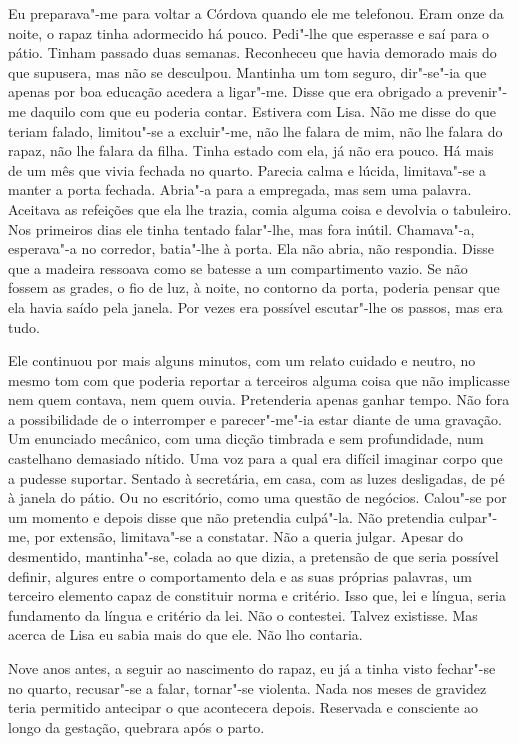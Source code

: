 Eu preparava"-me para voltar a Córdova quando ele me telefonou. Eram
onze da noite, o rapaz tinha adormecido há pouco. Pedi"-lhe que
esperasse e saí para o pátio. Tinham passado duas semanas. Reconheceu
que havia demorado mais do que supusera, mas não se desculpou. Mantinha
um tom seguro, dir"-se"-ia que apenas por boa educação acedera a
ligar"-me. Disse que era obrigado a prevenir"-me daquilo com que eu
poderia contar. Estivera com Lisa. Não me disse do que teriam falado,
limitou"-se a excluir"-me, não lhe falara de mim, não lhe falara do
rapaz, não lhe falara da filha. Tinha estado com ela, já não era pouco.
Há mais de um mês que vivia fechada no quarto. Parecia calma e lúcida,
limitava"-se a manter a porta fechada. Abria"-a para a empregada, mas
sem uma palavra. Aceitava as refeições que ela lhe trazia, comia alguma
coisa e devolvia o tabuleiro. Nos primeiros dias ele tinha tentado
falar"-lhe, mas fora inútil. Chamava"-a, esperava"-a no corredor,
batia"-lhe à porta. Ela não abria, não respondia. Disse que a madeira
ressoava como se batesse a um compartimento vazio. Se não fossem as
grades, o fio de luz, à noite, no contorno da porta, poderia pensar que
ela havia saído pela janela. Por vezes era possível escutar"-lhe os
passos, mas era tudo.

Ele continuou por mais alguns minutos, com um relato cuidado e neutro,
no mesmo tom com que poderia reportar a terceiros alguma coisa que não
implicasse nem quem contava, nem quem ouvia. Pretenderia apenas ganhar
tempo. Não fora a possibilidade de o interromper e parecer"-me"-ia estar
diante de uma gravação. Um enunciado mecânico, com uma dicção timbrada e
sem profundidade, num castelhano demasiado nítido. Uma voz para a qual
era difícil imaginar corpo que a pudesse suportar. Sentado à secretária,
em casa, com as luzes desligadas, de pé à janela do pátio. Ou no
escritório, como uma questão de negócios. Calou"-se por um momento e
depois disse que não pretendia culpá"-la. Não pretendia culpar"-me, por
extensão, limitava"-se a constatar. Não a queria julgar. Apesar do
desmentido, mantinha"-se, colada ao que dizia, a pretensão de que seria
possível definir, algures entre o comportamento dela e as suas próprias
palavras, um terceiro elemento capaz de constituir norma e critério.
Isso que, lei e língua, seria fundamento da língua e critério da lei.
Não o contestei. Talvez existisse. Mas acerca de Lisa eu sabia mais do
que ele. Não lho contaria.

Nove anos antes, a seguir ao nascimento do rapaz, eu já a tinha visto
fechar"-se no quarto, recusar"-se a falar, tornar"-se violenta. Nada nos
meses de gravidez teria permitido antecipar o que acontecera depois.
Reservada e consciente ao longo da gestação, quebrara após o parto.

